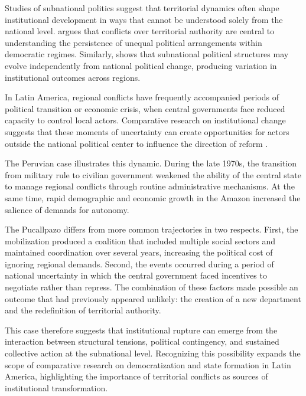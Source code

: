 \documentclass[12pt]{article}
\begin{document}
Studies of subnational politics suggest that territorial dynamics often
shape institutional development in ways that cannot be understood solely
from the national level. \textcite{gibson_boundary_2005} argues that conflicts
over territorial authority are central to understanding the persistence
of unequal political arrangements within democratic regimes. Similarly,
\textcite{giraudy_politics_2010} shows that subnational political structures may
evolve independently from national political change, producing variation
in institutional outcomes across regions.

In Latin America, regional conflicts have frequently accompanied periods
of political transition or economic crisis, when central governments face
reduced capacity to control local actors. Comparative research on
institutional change suggests that these moments of uncertainty can create
opportunities for actors outside the national political center to
influence the direction of reform
\autocite{boone_political_2003,silva_challenging_2009}.

The Peruvian case illustrates this dynamic. During the late 1970s, the
transition from military rule to civilian government weakened the ability
of the central state to manage regional conflicts through routine
administrative mechanisms. At the same time, rapid demographic and
economic growth in the Amazon increased the salience of demands for
autonomy.

The Pucallpazo differs from more common trajectories in two respects.
First, the mobilization produced a coalition that included multiple social
sectors and maintained coordination over several years, increasing the
political cost of ignoring regional demands. Second, the events occurred
during a period of national uncertainty in which the central government
faced incentives to negotiate rather than repress. The combination of
these factors made possible an outcome that had previously appeared
unlikely: the creation of a new department and the redefinition of
territorial authority.

This case therefore suggests that institutional rupture can emerge from
the interaction between structural tensions, political contingency, and
sustained collective action at the subnational level. Recognizing this
possibility expands the scope of comparative research on democratization
and state formation in Latin America, highlighting the importance of
territorial conflicts as sources of institutional transformation.

\end{document}
